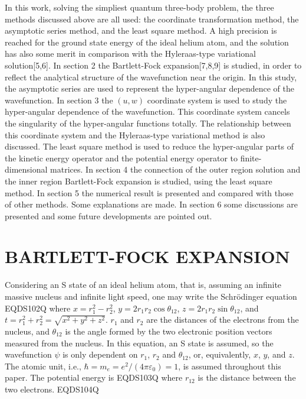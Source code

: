 In this work, solving the simpliest quantum three-body problem, the three methods
discussed above are all used: the coordinate transformation method,
the asymptotic series method, and the least square method. A high
precision is reached for the ground state energy of the ideal helium atom, and
the solution has also some merit in comparison with the Hyleraas-type variational
solution[5,6]. In section 2 the Bartlett-Fock expansion[7,8,9]
is studied, in order to
reflect the analytical structure of the wavefunction near the origin.
In this study, the asymptotic series are used to represent the hyper-angular
dependence of the wavefunction. In section 3 the $(u,w)$ coordinate system is
used to study the hyper-angular dependence of the wavefunction. This coordinate
system cancels the singularity of the hyper-angular functions totally. The
relationship between this coordinate system and the Hyleraas-type variational
method is also discussed. The least square method is used to 
reduce the hyper-angular parts of the kinetic
energy operator and the potential energy operator to finite-dimensional
matrices. In section 4 the connection
of the outer region solution and the inner region
Bartlett-Fock expansion is studied,
using the least square method. In section 5 the numerical result is presented
and compared with those of other methods. Some explanations are made. In section
6 some discussions are presented and some future developments are pointed out.

\section{BARTLETT-FOCK EXPANSION}

Considering an S state of an ideal helium atom, that is, assuming an infinite
massive nucleus and infinite light speed, one may write the Schr\"{o}dinger
equation
 EQDS102Q 
where $x=r_{1}^{2}-r_{2}^{2}$, $y=2 r_{1} r_{2} \cos\theta_{12}$,
$z=2 r_{1} r_{2} \sin\theta_{12}$, and
$t = r_{1}^{2}+r_{2}^{2} = \sqrt{x^{2}+y^{2}+z^{2}}$. $r_1$ and $r_2$
are the distances of the electrons from the nucleus, and $\theta_{12}$
is the angle formed by the two electronic position vectors measured from the
nucleus. In this equation, an S state is assumed, so the wavefunction
$\psi$ is only dependent on $r_1$, $r_2$ and $\theta_{12}$, or, equivalently,
$x$, $y$, and $z$. The atomic unit, i.e.,
$\hbar=m_e=e^{2}/(4\pi\varepsilon_{0})=1$, is assumed throughout this paper.
The potential energy is
 EQDS103Q 
where $r_{12}$ is the distance between the two electrons.
 EQDS104Q 

